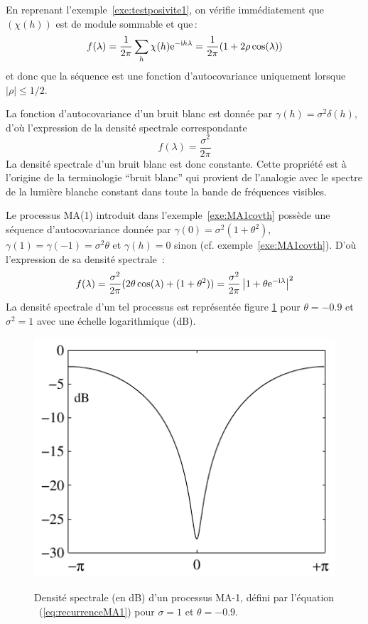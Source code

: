 \begin{example}
En reprenant l'exemple~\ref{exe:testposivite1}, on v\'erifie
imm\'ediatement que $(\chi(h))$ est de module sommable et que\,:
$$
 f(\lambda)=\frac{1}{2\pi}\sum_h \chi(h)\mathrm{e}^{-\mathrm{i} h \lambda}
     =\frac{1}{2\pi}(1+2\rho\cos( \lambda))
     $$
     et donc que la s\'equence est une fonction d'autocovariance uniquement
     lorsque $|\rho|\leq 1/2$.
\end{example}
\begin{example}
  La fonction d'autocovariance d'un bruit blanc est donn\'ee par $\gamma(h)=
  \sigma^2 \delta(h)$, d'o\`u l'expression de la densit\'e spectrale correspondante
\[
 f(\lambda) = \frac{\sigma^2}{2\pi}
\]
La densit\'e spectrale d'un bruit blanc est donc constante. Cette
propri\'et\'e est \`a l'origine de la terminologie ``bruit blanc'' qui
provient de l'analogie avec le spectre de la lumi\`ere blanche
constant dans toute la bande de fr\'equences visibles.
\end{example}
\begin{example}
  \label{ex:MA1dsp}
  Le processus MA(1) introduit dans l'exemple~\ref{exe:MA1covth} poss\`ede une
  s\'equence d'autocovariance donn\'ee par $\gamma(0) = \sigma^2(1+\theta^2)$,
  $\gamma(1) = \gamma(-1) = \sigma^2 \theta$ et $\gamma(h) = 0$ sinon (cf.
  exemple~\ref{exe:MA1covth}). D'o\`u l'expression de sa densit\'e spectrale~:
\[
 f(\lambda)= \frac{\sigma^2}{2 \pi} (2 \theta \cos(\lambda) + (1+ \theta^2))
     = \frac{\sigma^2}{2 \pi} \left |1+ \theta \mathrm{e}^{-\mathrm{i}\lambda}\right |^2
\]
La densit\'e spectrale d'un tel processus est repr\'esent\'ee figure
\ref{fig:dspthMA1} pour $\theta = -0.9$ et $\sigma^2=1$ avec une
\'echelle logarithmique (dB).
\end{example}
\begin{figure}
  \centering
  \includegraphics[width=\textwidth]{Figures/dspthMA1}\\
  \caption{Densit\'e spectrale (en dB) d'un processus MA-1, d\'efini par l'\'equation
~(\ref{eq:recurrenceMA1}) pour $\sigma=1$ et $\theta=-0.9$.}\label{fig:dspthMA1}
\end{figure}


